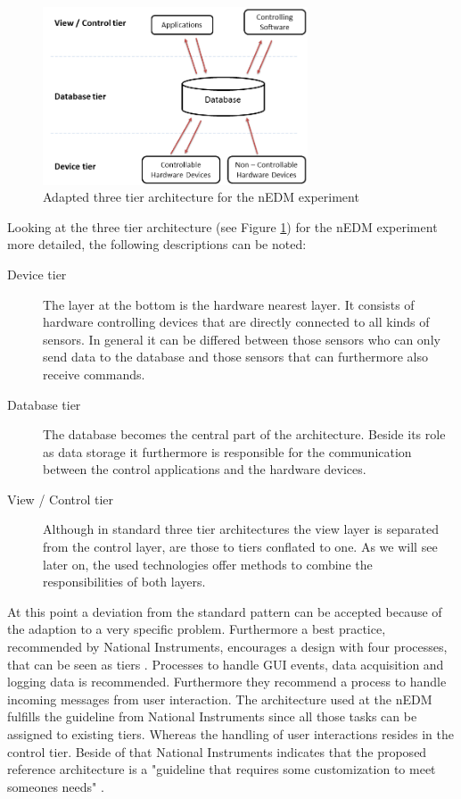 \begin{figure}[h!]
  \centering
      \includegraphics[width=0.7\textwidth]{images/DAQArchitecture.png}
  \caption{Adapted three tier architecture for the nEDM experiment}
  \label{figure:DAQArchitecture}
\end{figure}

Looking at the three tier architecture (see Figure \ref{figure:DAQArchitecture}) for the nEDM experiment more detailed, the following descriptions can be noted:
 \begin{description}
     \item[Device tier] The layer at the bottom is the hardware nearest layer. It consists of hardware controlling devices that are directly connected to all kinds of sensors. In general it can be differed between those sensors who can only send data to the database and those sensors that can furthermore also receive commands. 
     \item[Database tier] The database becomes the central part of the architecture. Beside its role as data storage it furthermore is responsible for the communication between the control applications and the hardware devices.  
     \item[View / Control tier] Although in standard three tier architectures the view layer is separated from the control layer, are those to tiers conflated to one. As we will see later on, the used technologies offer methods to combine the responsibilities of both layers. 
  \end{description}
  
  At this point a deviation from the standard pattern can be accepted because of the adaption to a very specific problem. Furthermore a best practice, recommended by National Instruments, encourages a design with four processes, that can be seen as tiers \cite{NI10}. Processes to handle GUI events, data acquisition and logging data is recommended. Furthermore they recommend a process to handle incoming messages from user interaction. The architecture used at the nEDM fulfills the guideline from National Instruments since all those tasks can be assigned to existing tiers. Whereas the handling of user interactions resides in the control tier. Beside of that National Instruments indicates that the proposed reference architecture is a "guideline that requires some customization to meet someones needs" \cite{NI10}.\\
  
